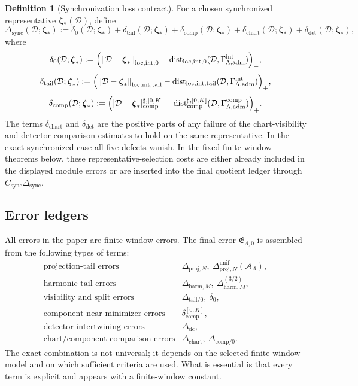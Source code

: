 \documentclass[11pt]{article}
\numberwithin{equation}{section}
\theoremstyle{definition}
\newtheorem{definition}[definition]{Definition}
\theoremstyle{remark}
\newcommand{\loc}{\mathrm{loc}}
\newcommand{\intg}{\mathrm{int}}
\newcommand{\tail}{\mathrm{tail}}
\newcommand{\adm}{\mathrm{adm}}
\newcommand{\proj}{\mathrm{proj}}
\newcommand{\harm}{\mathrm{harm}}
\newcommand{\comp}{\mathrm{comp}}
\newcommand{\detc}{\mathrm{det}}
\newcommand{\sync}{\mathrm{sync}}
\newcommand{\norm}[2]{\left\|#1\right\|_{#2}}
\newcommand{\Dist}{\operatorname{dist}}
\newcommand{\calA}{\mathcal A}
\newcommand{\calD}{\mathcal D}
\newcommand{\bzeta}{\boldsymbol\zeta}
\begin{document}
\begin{definition}[Synchronization loss contract]\label{def:sync-loss-contract}
For a chosen synchronized representative $\bzeta_*(\calD)$, define
\[
\Delta_{\sync}(\calD;\bzeta_*)
:=
\delta_0(\calD;\bzeta_*)+
\delta_{\tail}(\calD;\bzeta_*)+
\delta_{\comp}(\calD;\bzeta_*)+
\delta_{\mathrm{chart}}(\calD;\bzeta_*)+
\delta_{\detc}(\calD;\bzeta_*),
\]
where
\[
\delta_0(\calD;\bzeta_*)
:=
\Bigl(\norm{\calD-\bzeta_*}{\loc,\intg,0}
      -\Dist_{\loc,\intg,0}(\calD,\Gamma^{\intg}_{\Lambda,\adm})\Bigr)_+,
\]
\[
\delta_{\tail}(\calD;\bzeta_*)
:=
\Bigl(\norm{\calD-\bzeta_*}{\loc,\intg,\tail}
      -\Dist_{\loc,\intg,\tail}(\calD,\Gamma^{\intg}_{\Lambda,\adm})\Bigr)_+,
\]
\[
\delta_{\comp}(\calD;\bzeta_*)
:=
\Bigl(|\calD-\bzeta_*|_{\comp}^{\sharp,[0,K]}
      -\Dist_{\comp}^{\sharp,[0,K]}(\calD,\Gamma^{\comp}_{\Lambda,\adm})\Bigr)_+.
\]
The terms $\delta_{\mathrm{chart}}$ and $\delta_{\detc}$ are the positive parts of any failure of the chart-visibility and detector-comparison estimates to hold on the same representative.  In the exact synchronized case all five defects vanish.  In the fixed finite-window theorems below, these representative-selection costs are either already included in the displayed module errors or are inserted into the final quotient ledger through $C_{\sync}\Delta_{\sync}$.
\end{definition}

\subsection*{Error ledgers}

All errors in the paper are finite-window errors.  The final error \(\mathfrak E_{\Lambda,0}\) is assembled from the following types of terms:
\[
\begin{array}{ll}
\text{projection-tail errors} & \Delta_{\proj,N},\ \Delta^{\mathrm{unif}}_{\proj,N}(\calA_\Lambda),\\[0.2em]
\text{harmonic-tail errors} & \Delta_{\harm,M},\ \Delta^{(3/2)}_{\harm,M},\\[0.2em]
\text{visibility and split errors} & \Delta_{\tail/0},\ \delta_0,\\[0.2em]
\text{component near-minimizer errors} & \delta_{\comp}^{[0,K]},\\[0.2em]
\text{detector-intertwining errors} & \Delta_{\mathrm{dc}},\\[0.2em]
\text{chart/component comparison errors} & \Delta_{\mathrm{chart}},\ \Delta_{\comp/0}.
\end{array}
\]
The exact combination is not universal; it depends on the selected finite-window model and on which sufficient criteria are used.  What is essential is that every term is explicit and appears with a finite-window constant.
\end{document}
